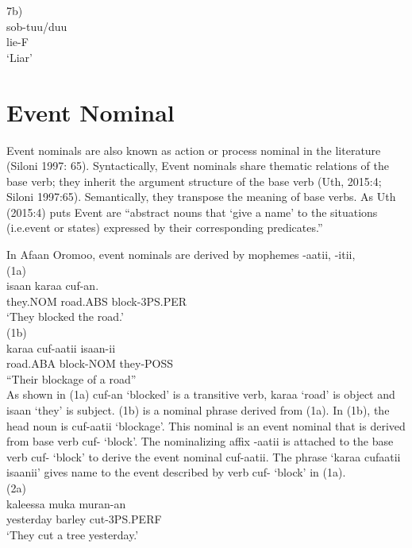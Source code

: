 \documentclass[11pt,a4paper]{article}
\begin{document}
7b)	\\
\indent sob-tuu/duu \\
\indent lie-F\\
\indent ‘Liar’\\

\section{Event Nominal}
Event nominals are also known as action or process nominal in the literature (Siloni 1997: 65). Syntactically, Event nominals share thematic relations of the base verb; they inherit the argument structure of the base verb (Uth, 2015:4; Siloni 1997:65). Semantically, they transpose the meaning of base verbs. As Uth (2015:4) puts Event are “abstract nouns that ‘give a name’ to the situations (i.e.event or states) expressed by their corresponding predicates.”

In Afaan Oromoo, event nominals are derived by mophemes  -aatii, -itii, \\

(1a) 	\\
\indent isaan 		karaa 		cuf-an.\\
\indent they.NOM	road.ABS	block-3PS.PER\\
\indent ‘They blocked the road.’\\

(1b) 	\\
\indent karaa		cuf-aatii	isaan-ii\\
\indent road.ABA	block-NOM	they-POSS\\
\indent “Their blockage of a road”\\

As shown in (1a) cuf-an ‘blocked’ is a transitive verb, karaa ‘road’ is object and isaan ‘they’ is subject. (1b) is a nominal phrase derived from (1a). In (1b), the head noun is cuf-aatii ‘blockage’. This nominal is an event nominal that is derived from base verb cuf- ‘block’. The nominalizing affix -aatii is attached to the base verb cuf- ‘block’ to derive the event nominal cuf-aatii. The phrase ‘karaa cufaatii isaanii’ gives name to the event described by verb cuf- ‘block’ in (1a). \\

(2a) 	\\
\indent kaleessa 		muka 		muran-an\\
\indent yesterday		barley		cut-3PS.PERF\\
\indent ‘They cut a tree yesterday.’\\
\end{document}
